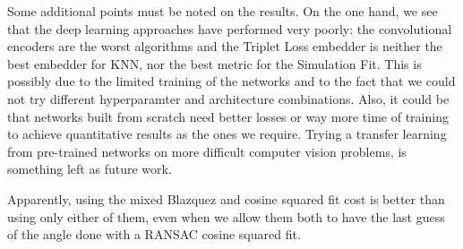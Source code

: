 \documentclass[11pt, a4paper, twoside]{article} %
\begin{document}
Some additional points must be noted on the results. On the one hand, we see that the deep learning approaches have performed very poorly: the convolutional encoders are the worst algorithms and the Triplet Loss embedder is neither the best embedder for KNN, nor the best metric for the Simulation Fit. This is possibly due to the limited training of the networks and to the fact that we could not try different hyperparamter and architecture combinations. Also, it could be that networks built from scratch need better losses or way more time of training to achieve quantitative results as the ones we require. Trying a transfer learning from pre-trained networks on more difficult computer vision problems, is something left as future work.

Apparently, using the mixed Blazquez and cosine squared fit cost is better than using only either of them, even when we allow them both to have the last guess of the angle done with a RANSAC cosine squared fit.
\end{document}
